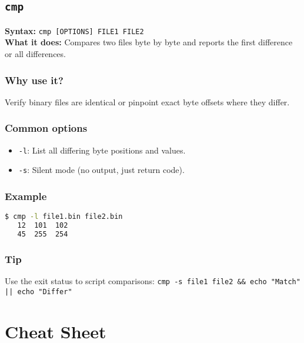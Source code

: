 \documentclass[10pt,oneside]{scrbook}
\begin{document}
\section{\texttt{cmp}}
\begin{cmdbox}
  \textbf{Syntax:} \lstinline!cmp [OPTIONS] FILE1 FILE2! \\
  \textbf{What it does:} Compares two files byte by byte and reports the first difference or all differences.
\end{cmdbox}
\begin{commanddetails}
  \subsection*{Why use it?}
    Verify binary files are identical or pinpoint exact byte offsets where they differ.

  \subsection*{Common options}
    \begin{itemize}
      \item \lstinline!-l!: List all differing byte positions and values.  
      \item \lstinline!-s!: Silent mode (no output, just return code).  
    \end{itemize}

  \subsection*{Example}
  \begin{lstlisting}[language=bash]
$ cmp -l file1.bin file2.bin
   12  101  102
   45  255  254
  \end{lstlisting}

  \subsection*{Tip}
    Use the exit status to script comparisons:  
    \lstinline!cmp -s file1 file2 && echo "Match" || echo "Differ"!
\end{commanddetails}

\appendix
\chapter{Cheat Sheet}
\end{document}
